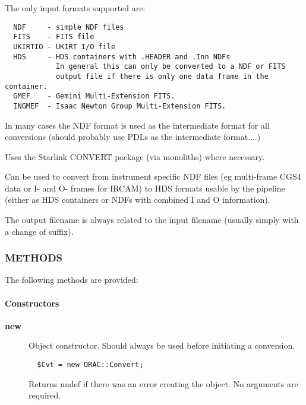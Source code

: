 The only input formats supported are:

\begin{verbatim}
  NDF     - simple NDF files
  FITS    - FITS file
  UKIRTIO - UKIRT I/O file
  HDS     - HDS containers with .HEADER and .Inn NDFs
            In general this can only be converted to a NDF or FITS
            output file if there is only one data frame in the container.
  GMEF    - Gemini Multi-Extension FITS.
  INGMEF  - Isaac Newton Group Multi-Extension FITS.
\end{verbatim}


In many cases the NDF format is used as the intermediate format for
all conversions (should probably use PDLs as the intermediate
format....)



Uses the Starlink CONVERT package (via monoliths) where necessary.



Can be used to convert from instrument specific NDF files (eg
multi-frame CGS4 data or I- and O- frames for IRCAM) to HDS formats
usable by the pipeline (either as HDS containers or NDFs with combined
I and O information).



The output filename is always related to the input filename
(usually simply with a change of suffix).

\subsubsection*{METHODS\label{ORAC::Convert_METHODS}}


The following methods are provided:

\paragraph*{Constructors\label{ORAC::Convert_Constructors}}
\begin{description}

\item[\textbf{new}] \mbox{}

Object constructor. Should always be used before initiating a conversion.

\begin{verbatim}
  $Cvt = new ORAC::Convert;
\end{verbatim}


Returns undef if there was an error creating the object. No arguments
are required.

\end{description}
